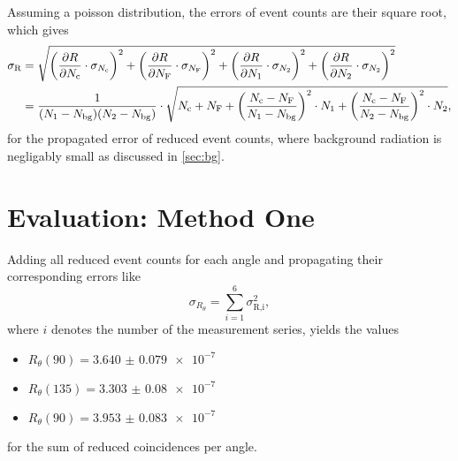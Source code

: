 Assuming a poisson distribution, the errors of event counts are their square root, which gives
\begin{align*}
	\sigma_\text{R} &= \sqrt{\left(\frac{\partial R}{\partial N_\text{c}}\cdot\sigma_{N_\text{c}}\right)^2
	+ \left(\frac{\partial R}{\partial N_\text{F}}\cdot\sigma_{N_\text{F}}\right)^2
	+ \left(\frac{\partial R}{\partial N_1}\cdot\sigma_{N_2}\right)^2
	+ \left(\frac{\partial R}{\partial N_2}\cdot\sigma_{N_2}\right)^2} \\
	&=\frac{1}{(N_1-N_\text{bg})(N_2-N_\text{bg})}
	\cdot\sqrt{N_\text{c} + N_\text{F} + \left(\frac{N_\text{c}-N_\text{F}}{N_1-N_\text{bg}}\right)^2\cdot N_1
	+ \left(\frac{N_\text{c}-N_\text{F}}{N_2-N_\text{bg}}\right)^2\cdot N_2},
\end{align*}
for the propagated error of reduced event counts, where background radiation is negligably small as discussed in \autoref{sec:bg}.

\section{Evaluation: Method One}
Adding all reduced event counts for each angle and propagating their corresponding errors like
\begin{equation*}
	\sigma_{R_\theta}=\sum_{i=1}^{6}\sigma_\text{R,i}^2,
\end{equation*}
where $i$ denotes the number of the measurement series, yields the values
\begin{itemize}
	\item $R_\theta (90)=\num{3.640(79)e-7}$
	\item $R_\theta (135)=\num{3.303(80)e-7}$
	\item $R_\theta (90)=\num{3.953(83)e-7}$
\end{itemize}
for the sum of reduced coincidences per angle.
